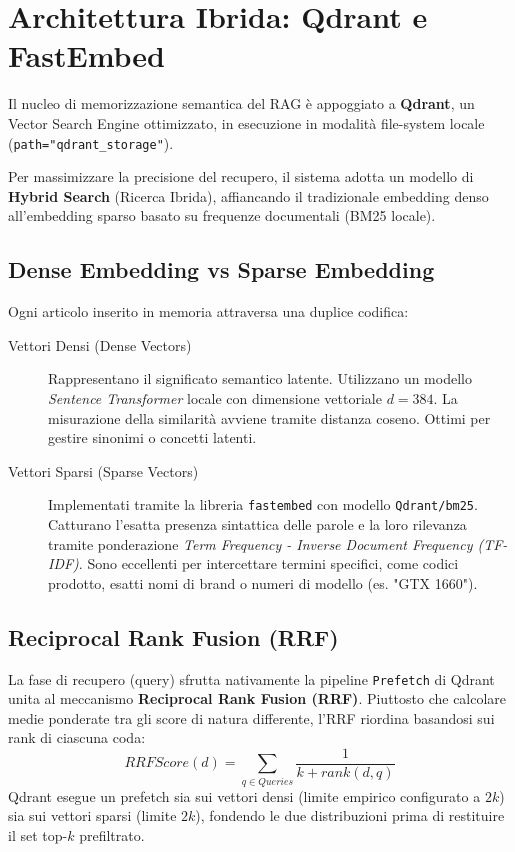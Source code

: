 \section{Architettura Ibrida: Qdrant e FastEmbed}
\label{sec:rag-arch}

Il nucleo di memorizzazione semantica del RAG è appoggiato a \textbf{Qdrant}, un Vector Search Engine ottimizzato, in esecuzione in modalità file-system locale (\texttt{path="qdrant\_storage"}).

Per massimizzare la precisione del recupero, il sistema adotta un modello di \textbf{Hybrid Search} (Ricerca Ibrida), affiancando il tradizionale embedding denso all'embedding sparso basato su frequenze documentali (BM25 locale).

\subsection{Dense Embedding vs Sparse Embedding}
\label{subsec:rag-embeddings}

Ogni articolo inserito in memoria attraversa una duplice codifica:
\begin{description}
    \item[Vettori Densi (Dense Vectors)] Rappresentano il significato semantico latente. Utilizzano un modello \textit{Sentence Transformer} locale con dimensione vettoriale $d = 384$. La misurazione della similarità avviene tramite distanza coseno. Ottimi per gestire sinonimi o concetti latenti.
    \item[Vettori Sparsi (Sparse Vectors)] Implementati tramite la libreria \texttt{fastembed} con modello \texttt{Qdrant/bm25}. Catturano l'esatta presenza sintattica delle parole e la loro rilevanza tramite ponderazione \textit{Term Frequency - Inverse Document Frequency (TF-IDF)}. Sono eccellenti per intercettare termini specifici, come codici prodotto, esatti nomi di brand o numeri di modello (es. "GTX 1660").
\end{description}

\subsection{Reciprocal Rank Fusion (RRF)}
\label{subsec:rag-rrf}

La fase di recupero (query) sfrutta nativamente la pipeline \texttt{Prefetch} di Qdrant unita al meccanismo \textbf{Reciprocal Rank Fusion (RRF)}. Piuttosto che calcolare medie ponderate tra gli score di natura differente, l'RRF riordina basandosi sui rank di ciascuna coda:
\begin{equation}
    RRFScore(d) = \sum_{q \in Queries} \frac{1}{k + rank(d, q)}
\end{equation}
Qdrant esegue un prefetch sia sui vettori densi (limite empirico configurato a $2k$) sia sui vettori sparsi (limite $2k$), fondendo le due distribuzioni prima di restituire il set top-$k$ prefiltrato.

